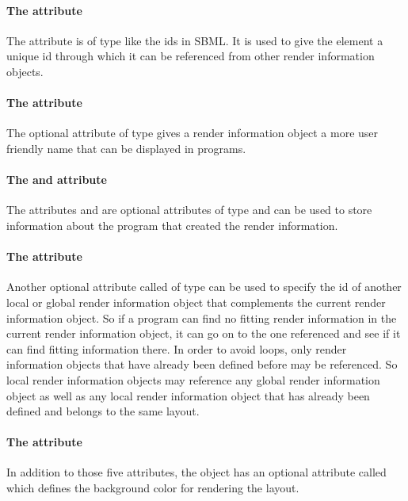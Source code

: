 \paragraph{The  attribute}
The  attribute is of type  like the ids 
in SBML. It is used to give the  element a unique id 
through which it can be referenced from other render information objects. 

\paragraph{The  attribute}
The optional attribute  of type  gives a 
render information object a more user friendly name that can be displayed 
in programs.

\paragraph{The  and   attribute}
The attributes  and  are optional attributes of 
type  and can be used to store information about the program 
that created the render information. 

\paragraph{The  attribute}
Another optional attribute called  of type
 can be used to specify the id of another local or global render information object 
that complements the current render information object. So if a program can 
find no fitting render information in the current render information object, it 
can go on to the one referenced and see if it can find fitting information 
there. In order to avoid loops, only render information objects that have 
already been defined before may be referenced. So local render information 
objects may reference any global render information object as well as any local 
render information object that has already been defined and belongs to the same layout. 

\paragraph{The  attribute}
In addition to those five attributes, the \RenderInformationBase object has an optional
attribute called  which defines the background color for rendering the layout.


